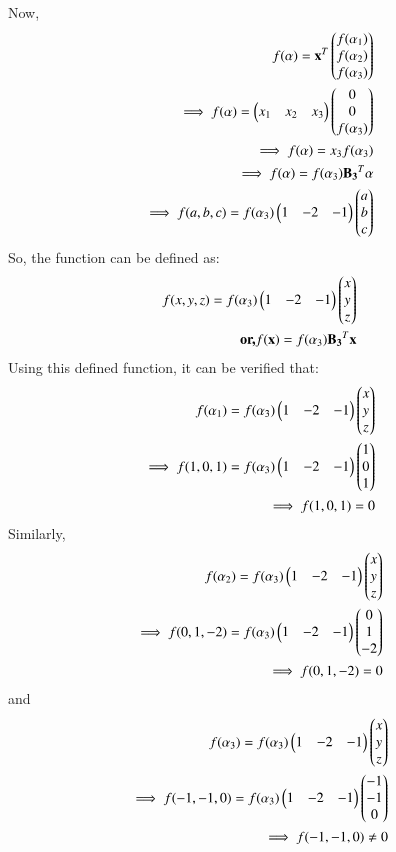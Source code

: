 \documentclass[journal,12pt,twocolumn]{IEEEtran}
\begin{document}
Now,
\begin{align}
f(\alpha) = \mathbf{x}^T \begin{pmatrix}f(\alpha_1)\\f(\alpha_2)\\f(\alpha_3)\end{pmatrix}\\
\implies f(\alpha) = \begin{pmatrix}x_1 & x_2 & x_3\end{pmatrix} \begin{pmatrix}0\\0\\f(\alpha_3)\end{pmatrix}\\
\implies f(\alpha) = x_3 f(\alpha_3)\\
\implies f(\alpha) = f(\alpha_3) \mathbf{B_3}^T \mathbf{\alpha}\\
\implies f(a,b,c) = f(\alpha_3) \begin{pmatrix}1 & -2 & -1\end{pmatrix}\begin{pmatrix}a\\b\\c\end{pmatrix}
\end{align}
So, the function can be defined as:
\begin{align}
f(x,y,z) = f(\alpha_3) \begin{pmatrix}1 & -2 & -1\end{pmatrix}\begin{pmatrix}x\\y\\z\end{pmatrix}\\
\textbf{or,} f(\mathbf{x}) = f(\alpha_3) \mathbf{B_3}^T \mathbf{x}
\end{align}
Using this defined function, it can be verified that:
\begin{align}
f(\alpha_1) =  f(\alpha_3) \begin{pmatrix}1 & -2 & -1\end{pmatrix}\begin{pmatrix}x\\y\\z\end{pmatrix}\\
\implies f(1,0,1)=f(\alpha_3) \begin{pmatrix}1 & -2 & -1\end{pmatrix}\begin{pmatrix}1\\0\\1\end{pmatrix}\\
\implies f(1,0,1)= 0
\end{align}
Similarly,
\begin{align}
f(\alpha_2) = f(\alpha_3) \begin{pmatrix}1 & -2 & -1\end{pmatrix}\begin{pmatrix}x\\y\\z\end{pmatrix}\\
\implies f(0,1,-2)= f(\alpha_3) \begin{pmatrix}1 & -2 & -1\end{pmatrix}\begin{pmatrix}0\\1\\-2\end{pmatrix}\\
\implies f(0,1,-2)= 0
\end{align}
and 
\begin{align}
f(\alpha_3) = f(\alpha_3) \begin{pmatrix}1 & -2 & -1\end{pmatrix}\begin{pmatrix}x\\y\\z\end{pmatrix}\\
\implies f(-1,-1,0)= f(\alpha_3) \begin{pmatrix}1 & -2 & -1\end{pmatrix}\begin{pmatrix}-1\\-1\\0\end{pmatrix}\\
\implies f(-1,-1,0)\neq 0
\end{align}
\end{document}
